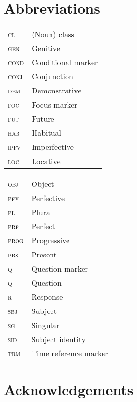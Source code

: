 \documentclass[output=paper,colorlinks,citecolor=brown]{langscibook}
\begin{document}
\section*{Abbreviations}
\begin{tabularx}{.45\textwidth}{>{\scshape}lQ}
cl & (Noun) class\\
gen & Genitive\\
cond & Conditional marker\\
conj & Conjunction\\
dem & Demonstrative\\
foc & Focus marker\\
fut & Future\\
hab & Habitual\\
ipfv & Imperfective\\
loc & Locative\\
\end{tabularx}
\begin{tabularx}{.45\textwidth}{>{\scshape}lQ}
obj & Object\\
pfv & Perfective\\
pl & Plural\\
prf & Perfect\\
prog & Progressive\\
prs & Present\\
q & Question marker\\
q & Question\\
r & Response\\
sbj & Subject\\
sg & Singular\\
sid & Subject identity\\
trm & Time reference marker\\
\end{tabularx}

\section*{Acknowledgements}



\printbibliography[heading=subbibliography,notkeyword=this]
\end{document}

